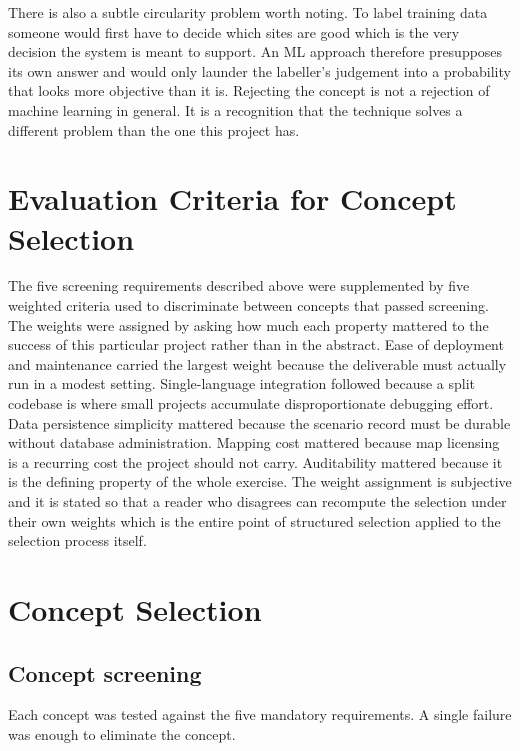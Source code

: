 \documentclass[12pt,a4paper]{report}
\begin{document}
There is also a subtle circularity problem worth noting. To label
training data someone would first have to decide which sites are good
which is the very decision the system is meant to support. An ML
approach therefore presupposes its own answer and would only launder
the labeller's judgement into a probability that looks more objective
than it is. Rejecting the concept is not a rejection of machine
learning in general. It is a recognition that the technique solves a
different problem than the one this project has.

\section{Evaluation Criteria for Concept Selection}
The five screening requirements described above were supplemented by
five weighted criteria used to discriminate between concepts that
passed screening. The weights were assigned by asking how much each
property mattered to the success of this particular project rather
than in the abstract. Ease of deployment and maintenance carried the
largest weight because the deliverable must actually run in a modest
setting. Single-language integration followed because a split codebase
is where small projects accumulate disproportionate debugging effort.
Data persistence simplicity mattered because the scenario record must
be durable without database administration. Mapping cost mattered
because map licensing is a recurring cost the project should not
carry. Auditability mattered because it is the defining property of
the whole exercise. The weight assignment is subjective and it is
stated so that a reader who disagrees can recompute the selection
under their own weights which is the entire point of structured
selection applied to the selection process itself.

\section{Concept Selection}

\subsection{Concept screening}
Each concept was tested against the five mandatory requirements. A
single failure was enough to eliminate the concept.
\end{document}
